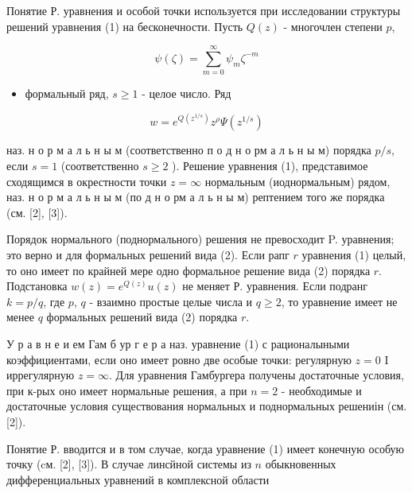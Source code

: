 \documentclass[10pt]{article}
\begin{document}
Понятие Р. уравнения и особой точки используется при исследовании структуры решений уравнения (1) на бесконечности. Пусть $Q(z)$ - многочлен степени $p$,



\[

\psi(\zeta)=\sum_{m=0}^{\infty} \psi_{m} \zeta^{-m}

\]



\begin{itemize}

  \item формальный ряд, $s \geqslant 1$ - целое число. Ряд

\end{itemize}



\[

w=e^{Q\left(z^{1 / s}\right)} z^{\rho} \Psi\left(z^{1 / s}\right)

\]



наз. н о р м а л ь н ы м (соответственно п о д н о рм а л ь н ы м) порядка $p / s$, если $s=1$ (соответственно $s \geqslant 2$ ). Решение уравнения (1), представимое сходящимся в окрестности точки $z=\infty$ нормальным (иоднормальным) рядом, наз. н о р м а л ь н ы м (по д н о рм а л ь н ы м) рептением того же порядка (см. [2], [3]).



Порядок нормального (поднормального) решения не превосходит P. уравнения; это верно и для формальных решений вида (2). Если рапг $r$ уравнения (1) целый, то оно имеет по крайней мере одно формальное решение вида (2) порядка $r$. Подстановка $w(z)=e^{Q(z)} u(z)$ не меняет Р. уравнения. Если подранг $k=p / q$, где $p$, $q$ - взаимно простые целые числа и $q \geqslant 2$, то уравнение имеет не менее $q$ формальных решений вида (2) порядка $r$.



У р а в н е и ем Гам б ур г е р а наз. уравнение (1) с рационалыными коэффициентами, если оно имеет ровно две особые точки: регулярную $z=0$ I иррегулярную $z=\infty$. Для уравнения Гамбургера получены достаточные условия, при к-рых оно имеет нормальные решения, а при $n=2$ - необходимые и достаточные условия существования нормальных и поднормальных решениін (см. [2]).



Понятие Р. вводится и в том случае, когда уравнение (1) имеет конечную особую точку (cм. [2], [3]). В случае линсйной системы из $n$ обыкновенных дифференциальных уравнений в комплексной области
\end{document}
